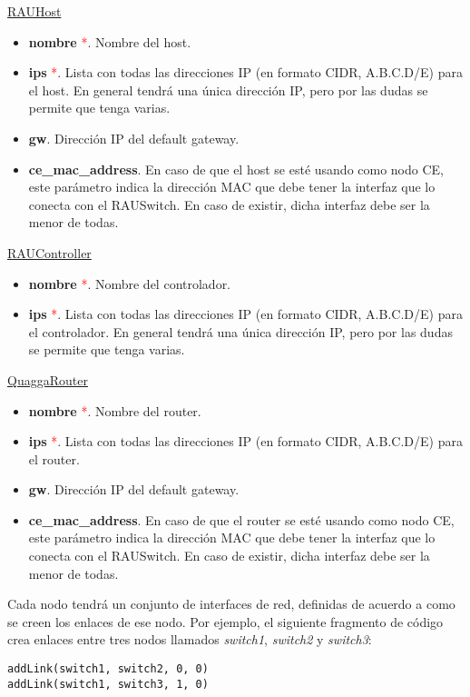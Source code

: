 \underline{RAUHost}

\begin{itemize}
	\item \textbf{nombre} \textcolor{red}{*}. Nombre del host.
	\item \textbf{ips} \textcolor{red}{*}. Lista con todas las direcciones IP (en formato CIDR, A.B.C.D/E) para el host. En general tendrá una única dirección IP, pero por las dudas se permite que tenga varias.
	\item \textbf{gw}.  Dirección IP del default gateway.
	\item \textbf{ce\_mac\_address}. En caso de que el host se esté usando como nodo CE, este parámetro indica la dirección MAC que debe tener la interfaz que lo conecta con el RAUSwitch. En caso de existir, dicha interfaz debe ser la menor de todas.
\end{itemize}

\underline{RAUController}

\begin{itemize}
	\item \textbf{nombre} \textcolor{red}{*}. Nombre del controlador.
	\item \textbf{ips} \textcolor{red}{*}. Lista con todas las direcciones IP (en formato CIDR, A.B.C.D/E) para el controlador. En general tendrá una única dirección IP, pero por las dudas se permite que tenga varias.
\end{itemize}

\underline{QuaggaRouter}

\begin{itemize}
	\item \textbf{nombre} \textcolor{red}{*}. Nombre del router.
	\item \textbf{ips} \textcolor{red}{*}. Lista con todas las direcciones IP (en formato CIDR, A.B.C.D/E) para el router.
	\item \textbf{gw}.  Dirección IP del default gateway.
	\item \textbf{ce\_mac\_address}. En caso de que el router se esté usando como nodo CE, este parámetro indica la dirección MAC que debe tener la interfaz que lo conecta con el RAUSwitch. En caso de existir, dicha interfaz debe ser la menor de todas.
\end{itemize}

Cada nodo tendrá un conjunto de interfaces de red, definidas de acuerdo a como se creen los enlaces de ese nodo. Por ejemplo, el siguiente fragmento de código crea enlaces entre tres nodos llamados \textit{switch1}, \textit{switch2} y \textit{switch3}:
\begin{lstlisting}
addLink(switch1, switch2, 0, 0)
addLink(switch1, switch3, 1, 0)
\end{lstlisting}

